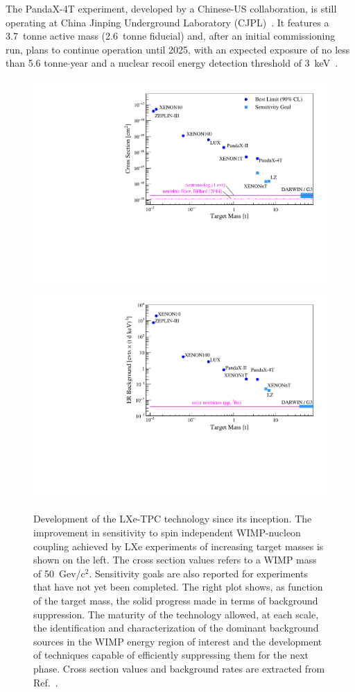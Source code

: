 The PandaX-4T experiment, developed by a Chinese-US collaboration, is still operating at China Jinping Underground Laboratory (CJPL)~\cite{Kang:2010zza}. It features a 3.7~tonne active mass (2.6~tonne fiducial) and, after an initial commissioning run, plans to continue operation until 2025, with an expected exposure of no less than 5.6 tonne$\cdot$year and a nuclear recoil energy detection threshold of 3~keV~\cite{PandaX:2018wtu}.

\begin{figure}[!htbp]
\begin{center}
\includegraphics[width=0.48\columnwidth]{figures/xenon_sens_vs_mass.pdf}
\includegraphics[width=0.48\columnwidth]{figures/xenon_background.pdf}
\caption{Development of the LXe-TPC technology since its inception. The improvement in sensitivity to spin independent WIMP-nucleon coupling achieved by LXe experiments of increasing target masses is shown on the left. The cross section values refers to a WIMP mass of 50~Gev/c$^2$. Sensitivity goals are also reported for experiments that have not yet been completed. The right plot shows, as function of the target mass, the solid progress made in terms of background suppression. The maturity of the technology allowed, at each scale, the identification and characterization of the dominant background sources in the WIMP energy region of interest and the development of techniques capable of efficiently suppressing them for the next phase. Cross section values and background rates are extracted from Ref.~\cite{PhysRevLett.100.021303,PhysRevD.94.122001,AKIMOV201214,PhysRevLett.116.161301,Wang_2020,XENON:2018voc,PandaX:2018wtu,PandaX-4T:2021bab,AKERIB201804,XENON:2020kmp}.
}
\label{fig:xenon_evolution}
\end{center}
\end{figure}

